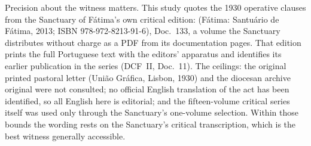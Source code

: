 Precision about the witness matters. This study quotes the 1930
operative clauses from the Sanctuary of F\'atima's own critical
edition:  (F\'atima: Santu\'ario de
F\'atima, 2013; ISBN 978-972-8213-91-6), Doc.~133, a volume the
Sanctuary distributes without charge as a PDF from its documentation
pages. That edition prints the full Portuguese text with the
editors' apparatus and identifies its earlier publication in the
series (DCF~II, Doc.~11). The ceilings: the original printed pastoral
letter (Uni\~ao Gr\'afica, Lisbon, 1930) and the diocesan archive
original were not consulted; no official English translation of the
act has been identified, so all English here is editorial; and the
fifteen-volume critical series itself was used only through the
Sanctuary's one-volume selection. Within those bounds the wording
rests on the Sanctuary's critical transcription, which is the best
witness generally accessible.
